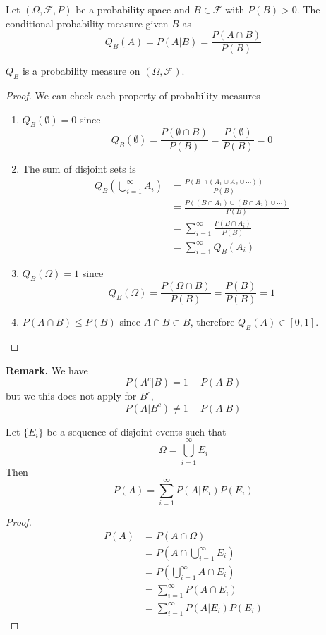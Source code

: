 \documentclass[openany]{report}
\begin{document}
\begin{definition}
    Let $(\Omega, \mathcal{F}, P)$ be a probability space and $B \in \mathcal{F}$ with $P(B) > 0$. The conditional probability measure given $B$ as 
    \[Q_B(A) = P(A|B) = \frac{P(A \cap B)}{P(B)}\]
\end{definition}
\begin{theorem}
    $Q_B$ is a probability measure on $(\Omega, \mathcal{F})$.
\end{theorem}
\begin{proof}
    We can check each property of probability measures
    \begin{enumerate}[label=(\roman*)]
        \item $Q_B(\emptyset) = 0$ since 
        \[Q_B(\emptyset) = \frac{P(\emptyset \cap B)}{P(B)} = \frac{P(\emptyset)}{P(B)}= 0\]
        \item The sum of disjoint sets is
        \begin{align*}
            Q_B\left(\bigcup_{i=1}^\infty A_i\right) &= \frac{P(B \cap (A_1 \cup A_2 \cup \cdots))}{P(B)}\\
            &= \frac{P((B \cap A_1) \cup (B \cap A_2) \cup \cdots)}{P(B)}\\
            &= \sum_{i=1}^\infty \frac{P(B \cap A_i)}{P(B)}\\
            &= \sum_{i=1}^\infty Q_B(A_i)
        \end{align*}
        \item $Q_B(\Omega) = 1$ since
        \[Q_B(\Omega) = \frac{P(\Omega\cap B)}{P(B)} = \frac{P(B)}{P(B)} = 1\]
        \item $P(A \cap B) \leq P(B)$ since $A \cap B \subset B$, therefore $Q_B(A) \in [0,1]$.
    \end{enumerate}
\end{proof}
\textbf{Remark.} We have 
\[P(A^c|B) = 1 - P(A|B)\]
but we this does not apply for $B^c$,
\[P(A|B^c) \neq 1 - P(A|B)\]
\begin{theorem}
    Let $\{E_i\}$ be a sequence of disjoint events such that 
    \[\Omega = \bigcup_{i=1}^\infty E_i\]
    Then 
    \[P(A) = \sum_{i=1}^\infty P(A | E_i)P(E_i)\]
\end{theorem}
\begin{proof}
    \begin{align*}
        P(A) &= P(A \cap \Omega)\\
        &= P\left(A \cap \bigcup_{i=1}^\infty E_i\right)\\
        &= P\left(\bigcup_{i=1}^\infty A \cap E_i\right)\\
        &= \sum_{i=1}^\infty P(A \cap E_i)\\
        &= \sum_{i=1}^\infty P(A | E_i)P(E_i)
    \end{align*}
\end{proof}
\end{document}
